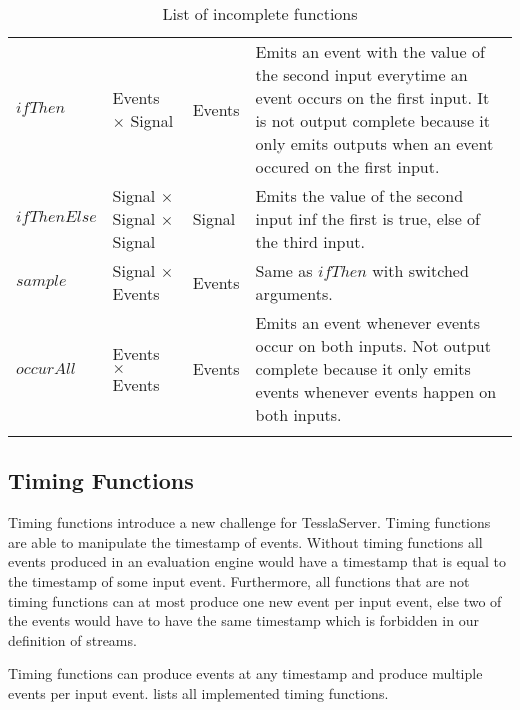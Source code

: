 \begin{longtable}{lp{3cm}lp{6cm}}
  \(\mathit{ifThen}\)           & Events \(\times\) Signal  & Events  & Emits an event with the value of the second input everytime an event occurs on the first input. It is not output complete because it only emits outputs when an event occured on the first input. \\
  \(\mathit{ifThenElse}\)       & Signal \(\times\) Signal \newline \(\times\) Signal  & Signal  & Emits the value of the second input inf the first is true, else of the third input.\\
  \(\mathit{sample}\)           & Signal \(\times\) Events  & Events  & Same as \(\mathit{ifThen}\) with switched arguments. \\
  \(\mathit{occurAll}\)         & Events \(\times\) Events  & Events  & Emits an event whenever events occur on both inputs. Not output complete because it only emits events whenever events happen on both inputs.\\
  \caption{List of incomplete functions}
\label{table:incomplete_functions}
\end{longtable}

\subsection{Timing Functions}
\label{sec:definitions:tessla_functions:timing}

Timing functions introduce a new challenge for TesslaServer.
Timing functions are able to manipulate the timestamp of events.
Without timing functions all events produced in an evaluation engine would have a timestamp that is equal to the timestamp of some input event.
Furthermore, all functions that are not timing functions can at most produce one new event per input event, else two of the events would have to have the same timestamp which is forbidden in our definition of streams.

Timing functions can produce events at any timestamp and produce multiple events per input event.
 lists all implemented timing functions.

